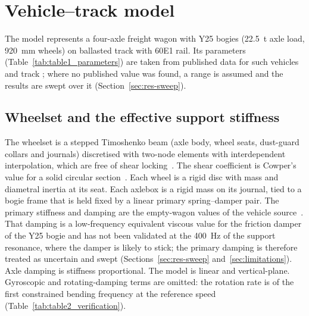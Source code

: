 \section{Vehicle--track model}\label{sec:model}
The model represents a four-axle freight wagon with Y25 bogies (22.5~t axle load, 920~mm wheels) on
ballasted track with 60E1 rail. Its parameters (Table~\ref{tab:table1_parameters}) are taken from
published data for such vehicles and track
\citep{dusza2023,dusza2024,bizic2021,bizic2024,nielsen2015,chaar2007,jin2016,ahmedov2023,han2025,li2019axlebox,unirail_ba004,interpipe_axles,railwayspares_ba004,skf_rth2012,schaeffler_wl07519,skf_evol2005,skf_evol2022,tatravagonka_y25,wascosa_eanos,railcargo_eanos,tstg_rails,britishsteel_rails,knuth2025,deman2000,thompson_eprint436918,jones1996,sanudo2022}; where no published value
was found, a range is assumed and the results are swept over it (Section~\ref{sec:res-sweep}).

\subsection{Wheelset and the effective support stiffness}\label{sec:wheelset}
The wheelset is a stepped Timoshenko beam (axle body, wheel seats, dust-guard collars and journals)
discretised with \NElements{} two-node elements with interdependent interpolation, which are free of
shear locking~\citep{friedman1993}. The shear coefficient is Cowper's value for a solid circular
section~\citep{cowper1966}. Each wheel is a rigid disc with mass and diametral inertia at its seat.
Each axlebox is a rigid mass on its journal, tied to a bogie frame that is held fixed by a linear
primary spring--damper pair. The primary stiffness and damping are the empty-wagon values of the
vehicle source~\citep{dusza2024}. That damping is a low-frequency equivalent viscous value for the
friction damper of the Y25 bogie and has not been validated at the 400~Hz of the support
resonance, where the damper is likely to stick; the primary damping is therefore treated as uncertain
and swept (Sections~\ref{sec:res-sweep} and~\ref{sec:limitations}). Axle damping is stiffness proportional. The model is linear and
vertical-plane. Gyroscopic and rotating-damping terms are omitted: the rotation rate is
\GyroRatio{} of the first constrained bending frequency at the reference speed (Table~\ref{tab:table2_verification}).

